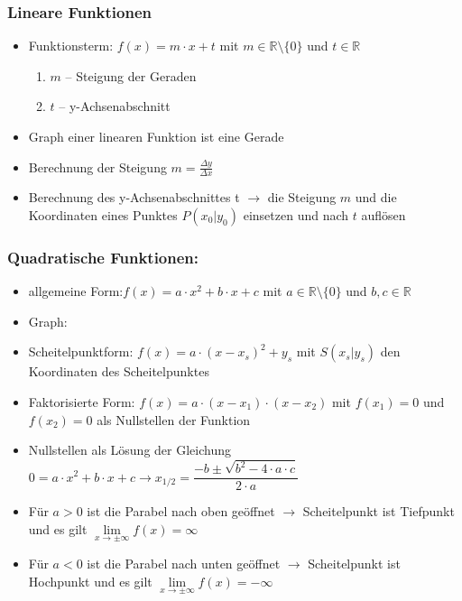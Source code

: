 \documentclass[a4paper,twocolumn,10pt]{onepgnote1}
\begin{document}
\subsubsection{Lineare Funktionen} 
\begin{itemize}
\item Funktionsterm: $f(x) = m\cdot x +t$ mit $m\in \mathds{R}\setminus\{0\}$ und $t\in \mathds{R}$ 
  \begin{enumerate}
  \item $m$ – Steigung der Geraden
  \item $t$ – y-Achsenabschnitt
  \end{enumerate}
  \item Graph einer linearen Funktion ist eine Gerade 
  \item Berechnung der Steigung $ m=\frac{\Delta y}{\Delta x}$
  \item Berechnung des y-Achsenabschnittes t $\longrightarrow$ die Steigung $m$ und die Koordinaten eines Punktes $P(x_0|y_0)$ einsetzen und nach $t$ auflösen
\end{itemize}
\subsubsection{Quadratische Funktionen:}
\begin{itemize}
\item allgemeine Form:$f(x) = a\cdot x^2 + b\cdot x +c$ mit $a\in \mathds{R}\setminus \{0\}$ und $b, c \in \mathds{R}$
\item Graph: 
\item Scheitelpunktform: $f(x) = a\cdot(x-x_s)^2 +y_s$ mit $S(x_s|y_s)$ den Koordinaten des Scheitelpunktes
\item Faktorisierte Form: $f(x)= a\cdot (x-x_1)\cdot (x-x_2)$ mit $f(x_1)= 0$ und $f(x_2)= 0$ als Nullstellen der Funktion
\item Nullstellen als Lösung der Gleichung\\ $0 =a\cdot x^2 + b\cdot x +c \longrightarrow x_{1/2} = \dfrac{-b\pm\sqrt{b^2-4\cdot a\cdot c}}{2\cdot a}$
\item Für $a>0$ ist die Parabel nach oben geöffnet $\longrightarrow$ Scheitelpunkt ist Tiefpunkt und es gilt $
\lim\limits_{x \to \pm\infty} f(x) = \infty$
\item Für $a<0$ ist die Parabel nach unten geöffnet $\longrightarrow$ Scheitelpunkt ist Hochpunkt und es gilt $
\lim\limits_{x \to \pm\infty} f(x) = -\infty$\\[0.15cm]
\end{itemize}
\end{document}
